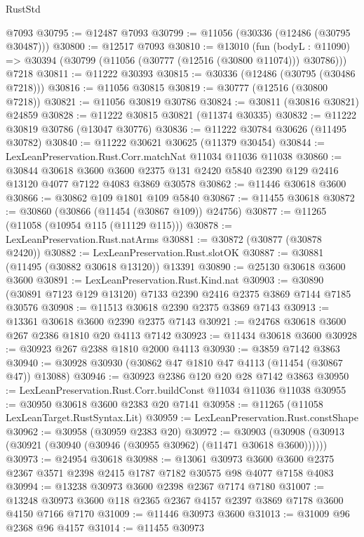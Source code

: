 \begin{lexlean}{RustStd}
\begin{coremodule}
    @7093
@30795 := @12487 @7093
@30799 := @11056 (@30336 (@12486 (@30795 @30487)))
@30800 := @12517 @7093
@30810 := @13010
    (fun (bodyL : @11090) => @30394 (@30799 (@11056 (@30777 (@12516 (@30800 @11074))) @30786)))
    @7218
@30811 := @11222 @30393
@30815 := @30336 (@12486 (@30795 (@30486 @7218)))
@30816 := @11056 @30815
@30819 := @30777 (@12516 (@30800 @7218))
@30821 := @11056 @30819 @30786
@30824 := @30811 (@30816 @30821) @24859
@30828 := @11222 @30815 @30821 (@11374 @30335)
@30832 := @11222 @30819 @30786 (@13047 @30776)
@30836 := @11222 @30784 @30626 (@11495 @30782)
@30840 := @11222 @30621 @30625 (@11379 @30454)
@30844 := LexLeanPreservation.Rust.Corr.matchNat @11034 @11036 @11038
@30860 := @30844
    @30618
    @3600
    @3600
    @2375
    @131
    @2420
    @5840
    @2390
    @129
    @2416
    @13120
    @4077
    @7122
    @4083
    @3869
    @30578
@30862 := @11446 @30618 @3600
@30866 := @30862 @109 @1801 @109 @5840
@30867 := @11455 @30618
@30872 := @30860 (@30866 (@11454 (@30867 @109)) @24756)
@30877 := @11265 (@11058 (@10954 @115 (@11129 @115)))
@30878 := LexLeanPreservation.Rust.natArms
@30881 := @30872 (@30877 (@30878 @2420))
@30882 := LexLeanPreservation.Rust.slotOK
@30887 := @30881 (@11495 (@30882 @30618 @13120)) @13391
@30890 := @25130 @30618 @3600 @3600
@30891 := LexLeanPreservation.Rust.Kind.nat
@30903 := @30890 (@30891 @7123 @129 @13120) @7133 @2390 @2416 @2375 @3869 @7144 @7185 @30576
@30908 := @11513 @30618 @2390 @2375 @3869 @7143
@30913 := @13361 @30618 @3600 @2390 @2375 @7143
@30921 := @24768 @30618 @3600 @267 @2386 @1810 @20 @4113 @7142
@30923 := @11434 @30618 @3600
@30928 := @30923 @267 @2388 @1810 @2000 @4113
@30930 := @3859 @7142 @3863
@30940 := @30928 @30930 (@30862 @47 @1810 @47 @4113 (@11454 (@30867 @47)) @13088)
@30946 := @30923 @2386 @120 @20 @28 @7142 @3863
@30950 := LexLeanPreservation.Rust.Corr.buildConst @11034 @11036 @11038
@30955 := @30950 @30618 @3600 @2383 @20 @7141
@30958 := @11265 (@11058 LexLeanTarget.RustSyntax.Lit)
@30959 := LexLeanPreservation.Rust.constShape
@30962 := @30958 (@30959 @2383 @20)
@30972 := @30903 (@30908 (@30913 (@30921 (@30940 (@30946 (@30955 @30962) (@11471 @30618 @3600))))))
@30973 := @24954 @30618
@30988 := @13061
    @30973
    @3600
    @3600
    @2375
    @2367
    @3571
    @2398
    @2415
    @1787
    @7182
    @30575
    @98
    @4077
    @7158
    @4083
@30994 := @13238 @30973 @3600 @2398 @2367 @7174 @7180
@31007 := @13248 @30973 @3600 @118 @2365 @2367 @4157 @2397 @3869 @7178 @3600 @4150 @7166 @7170
@31009 := @11446 @30973 @3600
@31013 := @31009 @96 @2368 @96 @4157
@31014 := @11455 @30973

\end{coremodule}
\end{lexlean}
